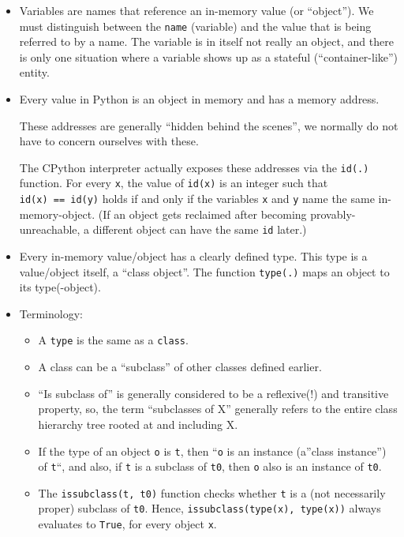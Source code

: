 \documentclass[11pt]{article}
\providecommand{\tightlist}{%
      \setlength{\itemsep}{0pt}\setlength{\parskip}{0pt}}
\begin{document}
\begin{itemize}
\item
  Variables are names that reference an in-memory value (or ``object'').
  We must distinguish between the \texttt{name} (variable) and the value
  that is being referred to by a name. The variable is in itself not
  really an object, and there is only one situation where a variable
  shows up as a stateful (``container-like'') entity.
\item
  Every value in Python is an object in memory and has a memory address.

  These addresses are generally ``hidden behind the scenes'', we
  normally do not have to concern ourselves with these.

  The CPython interpreter actually exposes these addresses via the
  \texttt{id(.)} function. For every \texttt{x}, the value of
  \texttt{id(x)} is an integer such that \texttt{id(x)\ ==\ id(y)} holds
  if and only if the variables \texttt{x} and \texttt{y} name the same
  in-memory-object. (If an object gets reclaimed after becoming
  provably-unreachable, a different object can have the same \texttt{id}
  later.)
\item
  Every in-memory value/object has a clearly defined type. This type is
  a value/object itself, a ``class object''. The function
  \texttt{type(.)} maps an object to its type(-object).
\item
  Terminology:

  \begin{itemize}
  \tightlist
  \item
    A \texttt{type} is the same as a \texttt{class}.
  \item
    A class can be a ``subclass'' of other classes defined earlier.
  \item
    ``Is subclass of'' is generally considered to be a reflexive(!) and
    transitive property, so, the term ``subclasses of X'' generally
    refers to the entire class hierarchy tree rooted at and including X.
  \item
    If the type of an object \texttt{o} is \texttt{t}, then ``\texttt{o}
    is an instance (a''class instance'') of \texttt{t}``, and also, if
    \texttt{t} is a subclass of \texttt{t0}, then \texttt{o} also is an
    instance of \texttt{t0}.
  \item
    The \texttt{issubclass(t,\ t0)} function checks whether \texttt{t}
    is a (not necessarily proper) subclass of \texttt{t0}. Hence,
    \texttt{issubclass(type(x),\ type(x))} always evaluates to
    \texttt{True}, for every object \texttt{x}.
  \end{itemize}
\end{itemize}
\end{document}
